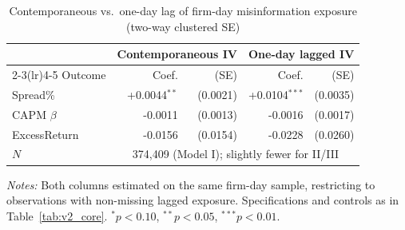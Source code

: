 \begin{table}[htbp]
\centering
\caption{Contemporaneous vs.\ one-day lag of firm-day misinformation exposure (two-way clustered SE)}
\label{tab:v2_lag}
\begin{threeparttable}
\begin{tabular}{l r r r r}
\toprule
 & \multicolumn{2}{c}{Contemporaneous IV} & \multicolumn{2}{c}{One-day lagged IV} \\
\cmidrule(lr){2-3}\cmidrule(lr){4-5}
Outcome & Coef. & (SE) & Coef. & (SE) \\
\midrule
Spread\% & +0.0044$^{**}$ & (0.0021) & +0.0104$^{***}$ & (0.0035) \\
CAPM $\beta$ & -0.0011 & (0.0013) & -0.0016 & (0.0017) \\
ExcessReturn & -0.0156 & (0.0154) & -0.0228 & (0.0260) \\
\midrule
$N$ & \multicolumn{4}{c}{374,409 (Model I); slightly fewer for II/III} \\
\bottomrule
\end{tabular}
\begin{tablenotes}\small
\item \textit{Notes:} Both columns estimated on the same firm-day sample, restricting to
observations with non-missing lagged exposure. Specifications and controls as in Table~\ref{tab:v2_core}.
$^{*}p<0.10$, $^{**}p<0.05$, $^{***}p<0.01$.
\end{tablenotes}
\end{threeparttable}
\end{table}